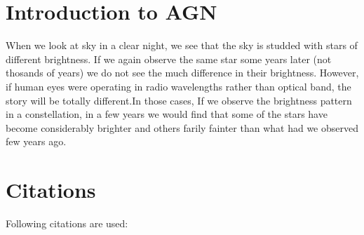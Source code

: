 \documentclass[12pt]{article}
\begin{document}
\section{Introduction to AGN}
When we look at sky in a clear night, we see that the sky is studded with stars of different brightness. If we again observe the same star some years later (not thosands of years) we do not see the much difference in their brightness. However, if human eyes were operating in radio wavelengths rather than optical band, the story will be totally different.In those cases,  If we observe the brightness pattern in a constellation, in a few years we would find that
some of the stars have become considerably brighter and others farily fainter than what had we observed few years ago. 

\clearpage
 \section{ Citations}
Following citations are used:

\cite{becerra} 
\cite{booth13}
\cite{car_ost06}

\cite{fabian12} 
\cite{ho08}
\cite{ish_fab12}  
  
\cite{king03}
\cite{king_pounds15}
\cite{sch_arny06}

\cite{silk_rees98}
\cite{silk_cintio_dvorkin13}
\cite{sp_gal07}



\end{document}
